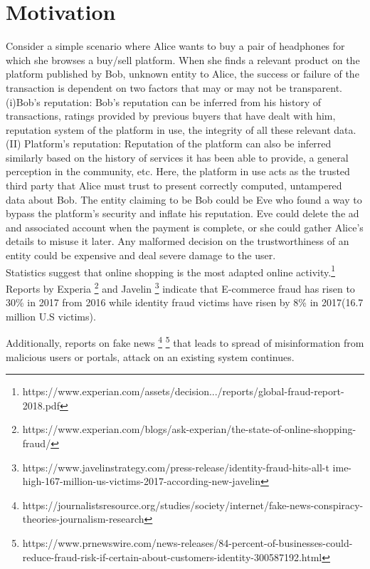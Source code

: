 \section{Motivation}
Consider a simple scenario where Alice wants to buy a pair of headphones for
which she browses a buy/sell platform. When she finds a relevant product on the
platform published by Bob, unknown entity to Alice, the success or failure of
the transaction is dependent on two factors that may or may not be transparent.\\
(i)Bob's reputation: Bob's reputation can be inferred from his history of
transactions, ratings provided by previous buyers that have dealt with him,
reputation system of the platform in use, the integrity of all these relevant
data. 
(II) Platform's reputation: Reputation of the platform can also be inferred
similarly based on the history of services it has been able to provide, a
general perception in the community, etc. 
Here, the platform in use acts as the trusted third party that Alice must trust
to present correctly computed, untampered data about Bob. The entity claiming
to be Bob could be Eve who found a way to bypass the platform's security and
inflate his reputation. Eve could delete the ad and associated account when the
payment is complete, or she could gather Alice's details to misuse it later.
Any malformed decision on the trustworthiness of an entity could be expensive
and deal severe damage to the user.\\ 
Statistics suggest that online shopping is the most adapted online
activity.\footnote{https://www.experian.com/assets/decision.../reports/global-fraud-report-2018.pdf}
Reports by Experia
\footnote{https://www.experian.com/blogs/ask-experian/the-state-of-online-shopping-fraud/}
and Javelin
\footnote{https://www.javelinstrategy.com/press-release/identity-fraud-hits-all-t
ime-high-167-million-us-victims-2017-according-new-javelin} indicate that
E-commerce fraud has risen to 30\% in 2017 from 2016 while identity fraud
victims have risen by 8\% in 2017(16.7 million U.S victims). 

Additionally, reports on fake news
\footnote{https://journalistsresource.org/studies/society/internet/fake-news-conspiracy-theories-journalism-research}
\footnote{https://www.prnewswire.com/news-releases/84-percent-of-businesses-could-reduce-fraud-risk-if-certain-about-customers-identity-300587192.html}
that leads to spread of misinformation from malicious users or portals, attack
on an existing system continues.

